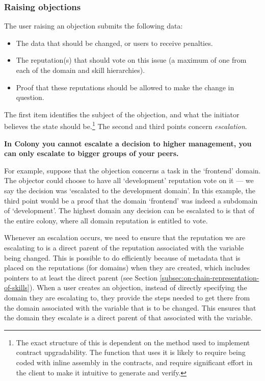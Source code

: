 \subsubsection{Raising objections}\label{subsec:raising-objections}

The user raising an objection submits the following data:
\begin{itemize}
 \item The data that should be changed, or users to receive penalties.
 \item The reputation(s) that should vote on this issue (a maximum of one from each of the domain and skill hierarchies).
 \item Proof that these reputations should be allowed to make the change in question.
\end{itemize}

The first item identifies the subject of the objection, and what the initiator believes the state should be.\footnote{The exact structure of this is dependent on the method used to implement contract upgradability. The function that uses it is likely to require being coded with inline assembly in the contracts, and require significant effort in the client to make it intuitive to generate and verify.} The second and third points concern \emph{escalation}.

\begin{center}
 \textbf{In Colony you cannot escalate a decision to higher management, you can only escalate to bigger groups of your peers.}
\end{center}

For example, suppose that the objection concerns a task in the `frontend' domain. The objector could choose to have all `development' reputation vote on it --- we say the decision was `escalated to the development domain'. In this example, the third point would be a proof that the domain `frontend' was indeed a subdomain of `development'. The highest domain any decision can be escalated to is that of the entire colony, where all domain reputation is entitled to vote.

Whenever an escalation occurs, we need to ensure that the reputation we are escalating to is a direct parent of the reputation associated with the variable being changed. This is possible to do efficiently because of metadata that is placed on the reputations (for domains) when they are created, which includes pointers to at least the direct parent (see Section \ref{subsec:on-chain-representation-of-skills}). When a user creates an objection, instead of directly specifying the domain they are escalating to, they provide the steps needed to get there from the domain associated with the variable that is to be changed. This ensures that the domain they escalate is a direct parent of that associated with the variable.

